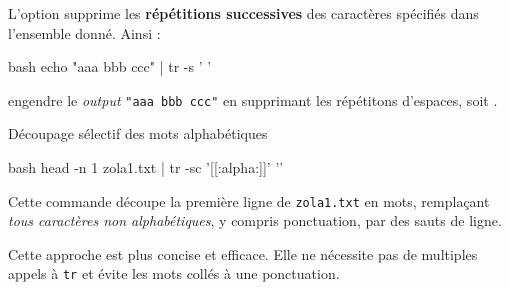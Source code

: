 \documentclass[a4paper, 14pt]{report}
\begin{document}
    \begin{Note}{}{}
        L'option  supprime les \textbf{répétitions successives} 
        des caractères spécifiés dans l'ensemble donné. Ainsi :



\begin{center}
\begin{cminted}{bash}
    echo "aaa   bbb    ccc" | tr -s ' '
\end{cminted}
\end{center}

        engendre le \textit{output} \texttt{"aaa bbb ccc"} en supprimant les répétitons 
        d'espaces, soit .
        \\\hfill
    \end{Note}
    \begin{Exemple}{Découpage sélectif des mots alphabétiques}{}

\begin{center}
\begin{minipage}{0.5\linewidth}
\begin{cminted}{bash}
head -n 1 zola1.txt | tr -sc '[[:alpha:]]' '\n'
\end{cminted}
\end{minipage}
\end{center}

        Cette commande découpe la première ligne de \texttt{zola1.txt} en mots, 
        remplaçant \textit{tous caractères non alphabétiques}, 
        y compris ponctuation, par des 
        sauts de ligne.

        \vspace{0.5em}
        Cette approche est plus concise et efficace. Elle ne nécessite pas de 
        multiples appels à \texttt{tr} et évite les mots collés à une ponctuation.
    \end{Exemple}
\end{document}

